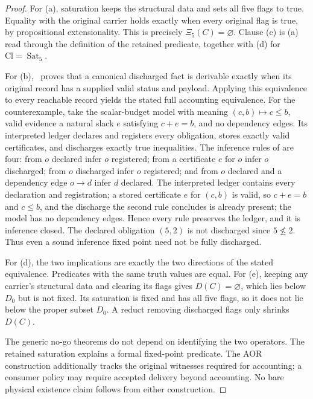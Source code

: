 \begin{proof}
For (a), saturation keeps the structural data and sets all five flags to true.
Equality with the original carrier holds exactly when every original flag is
true, by propositional extensionality. This is precisely
\(\Xi_5(C)=\varnothing\). Clause (c) is (a) read through the definition of the retained predicate, together with (d) for \(\mathrm{Cl}=\operatorname{Sat}_5\).

For (b), \PaperAOR\ proves that a canonical discharged fact is derivable
exactly when its original record has a supplied valid status and payload.
Applying this equivalence to every reachable record yields the stated full
accounting equivalence. For the counterexample, take the scalar-budget model
with meaning \((c,b)\mapsto c\le b\), valid evidence a natural slack
\(e\) satisfying \(c+e=b\), and no dependency edges. Its interpreted
ledger declares and registers every obligation, stores exactly valid
certificates, and discharges exactly true inequalities. The inference rules of \citet{Tsiokos2026AOR} are four: from \(o\) declared
infer \(o\) registered; from a certificate \(e\) for \(o\) infer \(o\)
discharged; from \(o\) discharged infer \(o\) registered; and from \(o\)
declared and a dependency edge \(o\to d\) infer \(d\) declared. The
interpreted ledger contains every declaration and registration; a stored
certificate \(e\) for \((c,b)\) is valid, so \(c+e=b\) and \(c\le b\), and the
discharge the second rule concludes is already present; the model has no
dependency edges. Hence every rule preserves the ledger, and it is inference
closed. The declared obligation \((5,2)\)
is not discharged since \(5\nleq2\). Thus even a sound inference fixed point
need not be fully discharged.

For (d), the two implications are exactly the two directions of the stated
equivalence. Predicates with the same truth values are equal. For (e), keeping
any carrier's structural data and clearing its flags gives \(D(C)=\varnothing\),
which lies below \(D_0\) but is not fixed. Its saturation is fixed and has
all five flags, so it does not lie below the proper subset \(D_0\).
A reduct removing discharged flags only shrinks \(D(C)\).

The generic no-go theorems do not depend on identifying the two operators.
The retained saturation explains a formal fixed-point predicate. The
AOR construction additionally tracks the original witnesses required for
accounting; a consumer policy may require accepted delivery beyond accounting.
No bare physical existence claim follows from either construction.
\end{proof}


